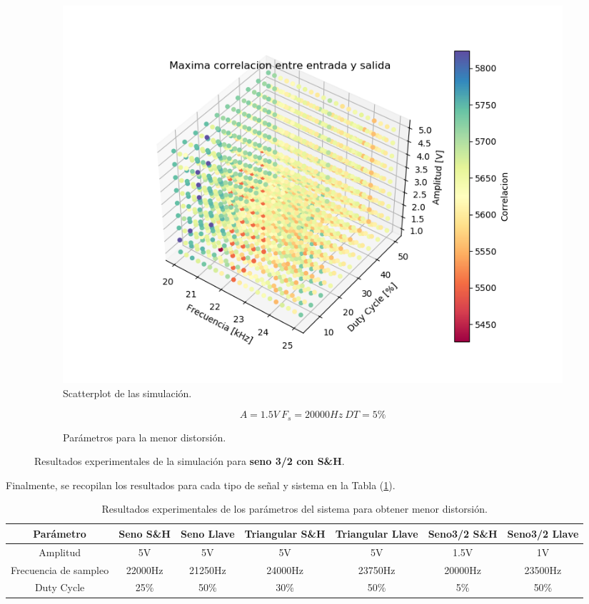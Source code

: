 \begin{figure}[H]
\centering
\begin{subfigure}{\linewidth}
\includegraphics[width=\linewidth]{ImagenesEjercicio6/scatter_sh_sen32.png}
\caption{Scatterplot de las simulación.}
\end{subfigure}

\begin{subfigure}{\linewidth}
\[A = 1.5V \ F_s = 20000Hz \ DT = 5\%\]
\caption{Parámetros para la menor distorsión.}
\end{subfigure}
\label{sen32_sh}
\caption{Resultados experimentales de la simulación para \textbf{seno 3/2 con S\&H}.}
\end{figure}

Finalmente, se recopilan los resultados para cada tipo de señal y sistema en la Tabla (\ref{tab:res}).
\begin{table}[H]
\begin{tabular}{@{}ccccccc@{}}
\toprule
Parámetro & Seno S\&H & Seno Llave & Triangular S\&H & Triangular Llave & Seno3/2 S\&H & Seno3/2 Llave \\ \midrule
Amplitud & 5V & 5V & 5V & 5V & 1.5V & 1V \\
Frecuencia de sampleo & 22000Hz & 21250Hz & 24000Hz & 23750Hz & 20000Hz & 23500Hz \\
Duty Cycle & 25\% & 50\% & 30\% & 50\% & 5\% & 50\% \\ \bottomrule
\end{tabular}
\label{tab:res}
\caption{Resultados experimentales de los parámetros del sistema para obtener menor distorsión.}
\end{table}

